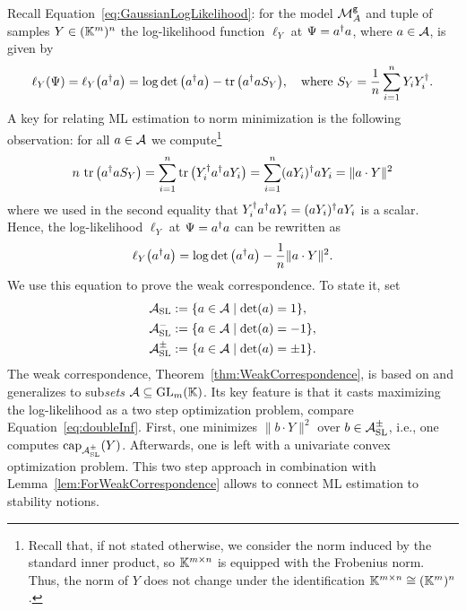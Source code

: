 Recall Equation~\eqref{eq:GaussianLogLikelihood}: for the model $\mathcal{M}^{\mathtt{g}}_A$ and tuple of samples $Y \in (\mathbb K^m)^n$ the log-likelihood function $\ell_Y$ at $\Psi = a^{\dagger} a$, where $a \in \mathcal{A}$, is given by
	\[ \ell_{Y} (\Psi) = \ell_{Y} \big( a^{\dagger} a \big) = \log \det \big( a^{\dagger} a \big) - \operatorname{tr} \big( a^{\dagger} a S_Y \big), \quad \text{where } S_Y = \frac{1}{n} \sum_{i=1}^n Y_i Y_i^{\dagger}.\]
A key for relating ML estimation to norm minimization is the following observation: for all $a \in \mathcal{A}$ we compute\footnote{Recall that, if not stated otherwise, we consider the norm induced by the standard inner product, so $\mathbb K^{m \times n}$ is equipped with the Frobenius norm. Thus, the norm of $Y$ does not change under the identification $\mathbb K^{m \times n} \cong (\mathbb K^m)^n$. }%
	\begin{equation}\label{eq:NormTrace}
		n \, \operatorname{tr} \big(a^{\dagger} a S_Y \big) = \sum_{i=1}^n \operatorname{tr} \big( Y^{\dagger}_i a^{\dagger} a Y_i \big) = \sum_{i=1}^n (a Y_i)^{\dagger} a Y_i = \| a \cdot Y \|^2 
	\end{equation}
where we used in the second equality that $Y^{\dagger}_i a^{\dagger} a Y_i  = (a Y_i)^{\dagger} a Y_i$ is a scalar. Hence, the log-likelihood $\ell_Y$ at $\Psi = a^{\dagger} a$ can be rewritten as
	\begin{equation}\label{eq:MgALogLikelihoodNorm}
		\ell_Y \big( a^{\dagger} a \big) = \log \det \big(a^{\dagger} a \big) - \frac{1}{n} \| a \cdot Y \|^2.
	\end{equation}
We use this equation to prove the weak correspondence. To state it, set
	\begin{align}
		\mathcal{A}_{\operatorname{SL}} &:= \{ a \in \mathcal{A} \mid \det(a) = 1\} , \label{eq:defnASL}\\
		\mathcal{A}_{\operatorname{SL}}^- &:= \{ a \in \mathcal{A} \mid \det(a) = -1\} , \label{eq:defnASL-}\\
		\mathcal{A}_{\operatorname{SL}}^{\pm} &:= \{ a \in \mathcal{A} \mid \det(a) = \pm 1\}. \label{eq:defnASLpm}
	\end{align}
The weak correspondence, Theorem~\ref{thm:WeakCorrespondence}, is based on \cite[Proposition~A.4]{RDAG} and generalizes \cite[Proposition~3.4 and Theorem~3.6]{SiagaPaper} to sub\emph{sets} $\mathcal{A} \subseteq \operatorname{GL}_m(\mathbb K)$. Its key feature is that it casts maximizing the log-likelihood as a two step optimization problem, compare Equation~\eqref{eq:doubleInf}. First, one minimizes $\|b \cdot Y\|^2$ over $b \in \mathcal{A}_{\operatorname{SL}}^{\pm}$, i.e., one computes $\operatorname{cap}_{\mathcal{A}_{\operatorname{SL}}^{\pm}}(Y)$. Afterwards, one is left with a univariate convex optimization problem. This two step approach in combination with Lemma~\ref{lem:ForWeakCorrespondence} allows to connect ML estimation to stability notions.

